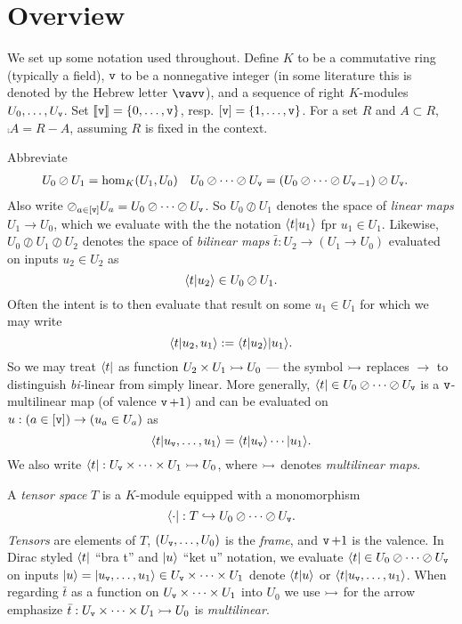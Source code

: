 \documentclass{documentation}
\begin{document}
\section{Overview}
We set up some notation used throughout. Define $K$ to be a commutative ring
(typically a field), $\operatorname{\mathtt{v}}$ to be a nonnegative integer (in some literature this
is denoted by the Hebrew letter $\vavv$), and a sequence of right $K$-modules
$U_0,\dots,U_{\operatorname{\mathtt{v}}}$. Set $\llbracket \operatorname{\mathtt{v}}\rrbracket=\{0,\dots,\operatorname{\mathtt{v}}\}$, resp.
$[\operatorname{\mathtt{v}}]=\{1,\ldots,\operatorname{\mathtt{v}}\}$. For a set $R$ and $A\subset R$, $\comp{A}=R-A$,
assuming $R$ is fixed in the context.

Abbreviate 
\begin{align*}
   U_0\oslash U_1 & = \hom_K(U_1,U_0)
   &
   U_0\oslash\cdots \oslash U_{\operatorname{\mathtt{v}}} & = (U_0\oslash\cdots\oslash U_{\operatorname{\mathtt{v}}-1})\oslash U_{\operatorname{\mathtt{v}}}.
\end{align*}
Also write $\oslash_{a\in[\operatorname{\mathtt{v}}]} U_a=U_0\oslash\cdots\oslash
U_{\operatorname{\mathtt{v}}}$.  So $U_0\oslash U_1$ denotes the space of \emph{linear maps} $U_1\to U_0$,
which we evaluate with the the notation $\langle t|u_1\rangle$ fpr $u_1\in U_1$.
Likewise, $U_0\oslash U_1\oslash U_2$ denotes the space of \emph{bilinear maps} 
$\bar{t}:U_2\to (U_1\to U_0)$ evaluated  on inputs $u_2\in U_2$ as
\[
   \langle t|u_2\rangle \in U_0\oslash U_1.
\]
Often the intent is to then evaluate that result on some $u_1\in U_1$ for which we may 
write 
\[
   \langle t|u_2,u_1\rangle := \langle t| u_2\rangle |u_1\rangle.
\]
So we may treat $\langle t|$ as function $U_2\times U_1\rightarrowtail U_0$ --- the symbol $\rightarrowtail$
replaces $\to$ to distinguish \emph{bi-}linear from simply linear.  More generally, 
$\langle t|\in U_0\oslash\cdots\oslash U_{\operatorname{\mathtt{v}}}$ is a $\operatorname{\mathtt{v}}$-multilinear map 
(of valence $\operatorname{\mathtt{v}}+1$) and can be evaluated  on $u:(a\in [\operatorname{\mathtt{v}}])\to (u_a\in U_a)$
as 
\[
   \langle t|u_{\operatorname{\mathtt{v}}},\ldots,u_1\rangle = \langle t|u_{\operatorname{\mathtt{v}}}\rangle\cdots |u_1\rangle.
\]
We also write $\langle t|:U_{\operatorname{\mathtt{v}}}\times\cdots\times U_1\rightarrowtail U_0$, where $\rightarrowtail$ denotes 
\emph{multilinear maps}.

A \emph{tensor space} $T$ is a $K$-module equipped with a monomorphism 
\[ 
   \langle \cdot| : T \hookrightarrow U_0\oslash \cdots\oslash U_{\operatorname{\mathtt{v}}}.
\] 
\emph{Tensors}
are elements of $T$, $(U_{\operatorname{\mathtt{v}}},\dots,U_0)$ is the \emph{frame}, and $\operatorname{\mathtt{v}}+1$ is
the valence. In Dirac styled $\langle t|$ ``bra t'' and $| u\rangle$ ``ket u''
notation, we evaluate $\langle t|\in U_0\oslash \cdots\oslash U_{\operatorname{\mathtt{v}}}$ on inputs
$| u\rangle=| u_{\operatorname{\mathtt{v}}},\dots, u_1\rangle\in U_{\operatorname{\mathtt{v}}}\times\cdots\times U_1$ denote
$\langle t|u\rangle$ or $\langle t| u_{\operatorname{\mathtt{v}}},\dots,u_1\rangle$.  When regarding $\bar{t}$
as a function on $U_{\operatorname{\mathtt{v}}}\times\cdots\times U_1$ into $U_0$ we use $\rightarrowtail$ for the 
arrow emphasize $\bar{t}:U_{\operatorname{\mathtt{v}}}\times\cdots\times U_1\rightarrowtail U_0$ is \emph{multilinear}.
\end{document}
